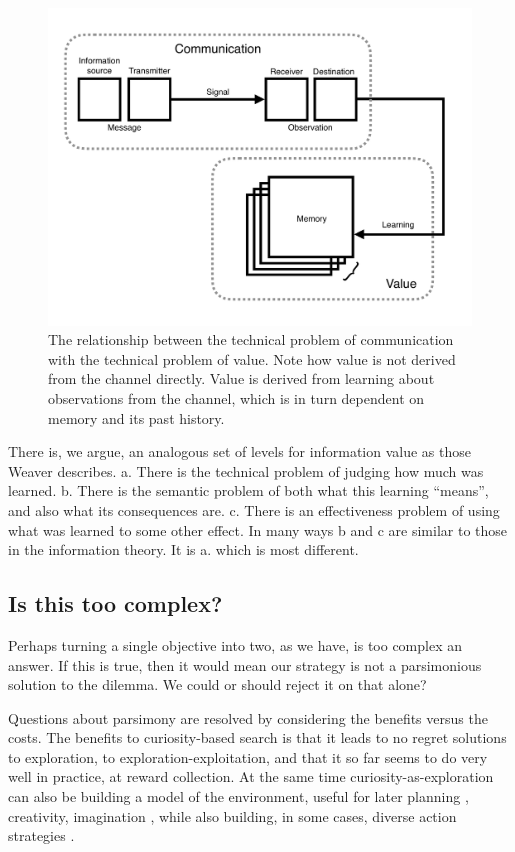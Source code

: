 \begin{figure}
\begin{fullwidth}
	\includegraphics[width=1.0\linewidth]{img/info_diagram.pdf} 
    \caption{The relationship between the technical problem of communication with the technical problem of value. Note how value is not derived from the channel directly. Value is derived from learning about observations from the channel, which is in turn dependent on memory and its past history.
    }
    \label{fig:info1} 
\end{fullwidth}
\end{figure}

There is, we argue, an analogous set of levels for information value as those Weaver describes. a. There is the technical problem of judging how much was learned. b. There is the semantic problem of both what this learning ``means'', and also what its consequences are. c. There is an effectiveness problem of using what was learned to some other effect. In many ways b and c are similar to those in the information theory. It is a. which is most different. 


\subsection*{Is this too complex?}
Perhaps turning a single objective into two, as we have, is too complex an answer. If this is true, then it would mean our strategy is not a parsimonious solution to the dilemma. We could or should reject it on that alone?

Questions about parsimony are resolved by considering the benefits versus the costs. The benefits to curiosity-based search is that it leads to no regret solutions to exploration, to exploration-exploitation, and that it so far seems to do very well in practice, at reward collection. At the same time curiosity-as-exploration can also be building a model of the environment, useful for later planning \cite{Ahilan2019,Poucet1993}, creativity, imagination \cite{Schmidhuber2010}, while also building, in some cases, diverse action strategies \cite{Lehman2011a,Lehman2013,Mouret2015,Colas2020}. 

